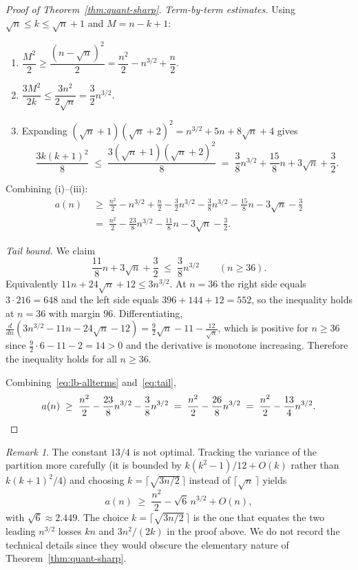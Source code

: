 ﻿\documentclass[11pt,a4paper]{article}
\theoremstyle{plain}
\theoremstyle{definition}
\theoremstyle{remark}
\newtheorem{remark}[theorem]{Remark}
\begin{document}
\begin{proof}[Proof of Theorem~\ref{thm:quant-sharp}]
\smallskip\noindent\textit{Term-by-term estimates.}
Using $\sqrt n\le k\le\sqrt n+1$ and $M=n-k+1$:
\begin{enumerate}[label=(\roman*),nosep]
\item $\dfrac{M^2}{2}\ge\dfrac{(n-\sqrt n)^2}{2}
  =\dfrac{n^2}{2}-n^{3/2}+\dfrac{n}{2}$.
\item $\dfrac{3M^2}{2k}\le\dfrac{3n^2}{2\sqrt n}=\dfrac{3}{2}n^{3/2}$.
\item Expanding $(\sqrt n+1)(\sqrt n+2)^2=n^{3/2}+5n+8\sqrt n+4$
  gives
  \[
    \frac{3k(k+1)^2}{8}
    \;\le\;\frac{3(\sqrt n+1)(\sqrt n+2)^2}{8}
    \;=\;\frac{3}{8}n^{3/2}+\frac{15}{8}n+3\sqrt n+\frac{3}{2}.
  \]
\end{enumerate}
Combining (i)--(iii):
\begin{align}
  a(n)
  &\;\ge\;\frac{n^2}{2}-n^{3/2}+\frac{n}{2}
        -\frac{3}{2}n^{3/2}
        -\frac{3}{8}n^{3/2}-\frac{15}{8}n-3\sqrt n-\frac{3}{2}
        \nonumber\\
  &\;=\;\frac{n^2}{2}-\frac{23}{8}n^{3/2}-\frac{11}{8}n-3\sqrt n-\frac{3}{2}.
        \label{eq:lb-allterms}
\end{align}

\smallskip\noindent\textit{Tail bound.}  We claim
\begin{equation}\label{eq:tail}
  \frac{11}{8}n+3\sqrt n+\frac{3}{2}\;\le\;\frac{3}{8}n^{3/2}
  \qquad(n\ge 36).
\end{equation}
Equivalently $11n+24\sqrt n+12\le 3n^{3/2}$.  At $n=36$ the right
side equals $3\cdot 216=648$ and the left side equals
$396+144+12=552$, so the inequality holds at $n=36$ with margin
$96$.  Differentiating, $\tfrac{d}{dn}(3n^{3/2}-11n-24\sqrt n-12)
=\tfrac{9}{2}\sqrt n-11-\tfrac{12}{\sqrt n}$, which is positive for
$n\ge 36$ since $\tfrac{9}{2}\cdot 6-11-2=14>0$ and the
derivative is monotone increasing.  Therefore the inequality holds
for all $n\ge 36$.

Combining~\eqref{eq:lb-allterms} and~\eqref{eq:tail},
\[
  a(n)\;\ge\;\frac{n^2}{2}-\frac{23}{8}n^{3/2}-\frac{3}{8}n^{3/2}
       \;=\;\frac{n^2}{2}-\frac{26}{8}n^{3/2}
       \;=\;\frac{n^2}{2}-\frac{13}{4}n^{3/2}. \qedhere
\]
\end{proof}

\begin{remark}\label{rem:quant-optimal}
The constant $13/4$ is not optimal.  Tracking the variance of the
partition more carefully (it is bounded by $k(k^2-1)/12+O(k)$ rather
than $k(k+1)^2/4$) and choosing $k=\lceil\sqrt{3n/2}\,\rceil$ instead
of $\lceil\sqrt n\,\rceil$ yields
\[
  a(n)\;\ge\;\frac{n^2}{2}-\sqrt 6\,n^{3/2}+O(n),
\]
with $\sqrt 6\approx 2.449$.  The choice $k=\lceil\sqrt{3n/2}\,\rceil$
is the one that equates the two leading $n^{3/2}$ losses $kn$ and
$3n^2/(2k)$ in the proof above.  We do not record the technical
details since they would obscure the elementary nature of
Theorem~\ref{thm:quant-sharp}.
\end{remark}
\end{document}
